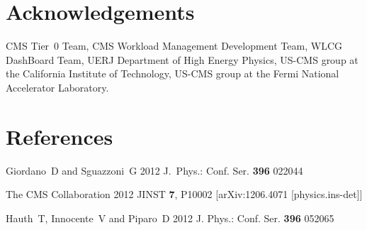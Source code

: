 \documentclass[a4paper]{jpconf}
\begin{document}
\section*{Acknowledgements}

CMS Tier~0 Team, CMS Workload Management Development Team, WLCG DashBoard Team, UERJ Department of High Energy Physics, US-CMS group at the California Institute of Technology, US-CMS group at the Fermi National Accelerator Laboratory.

\section*{References}
\begin{thebibliography}{1}

  Giordano~D and Sguazzoni~G 2012 J.~Phys.: Conf. Ser. {\bf 396} 022044

The CMS Collaboration 2012 JINST {\bf 7}, P10002 [arXiv:1206.4071 [physics.ins-det]]

Hauth~T, Innocente~V and Piparo~D 2012 J. Phys.: Conf. Ser. {\bf 396} 052065


\end{thebibliography}
\end{document}
